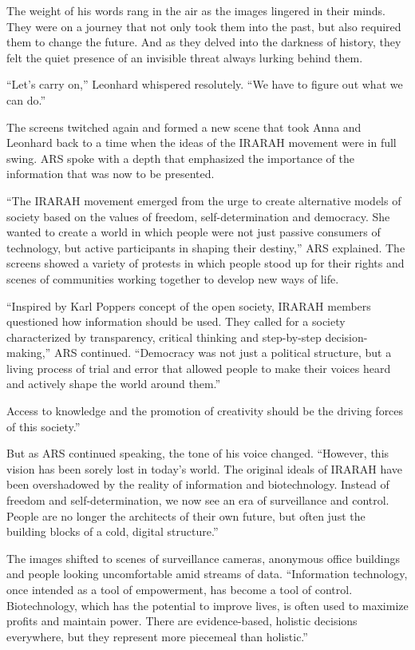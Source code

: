 \documentclass[
]{article}
\begin{document}
The weight of his words rang in the air as the images lingered in their
minds. They were on a journey that not only took them into the past, but
also required them to change the future. And as they delved into the
darkness of history, they felt the quiet presence of an invisible threat
always lurking behind them.

``Let's carry on,'' Leonhard whispered resolutely. ``We have to figure
out what we can do.''

The screens twitched again and formed a new scene that took Anna and
Leonhard back to a time when the ideas of the IRARAH movement were in
full swing. ARS spoke with a depth that emphasized the importance of the
information that was now to be presented.

``The IRARAH movement emerged from the urge to create alternative models
of society based on the values \hspace{0pt}\hspace{0pt}of freedom,
self-determination and democracy. She wanted to create a world in which
people were not just passive consumers of technology, but active
participants in shaping their destiny,'' ARS explained. The screens
showed a variety of protests in which people stood up for their rights
and scenes of communities working together to develop new ways of life.

``Inspired by Karl Popper\textquotesingle s concept of the open society,
IRARAH members questioned how information should be used. They called
for a society characterized by transparency, critical thinking and
step-by-step decision-making,'' ARS continued. ``Democracy was not just
a political structure, but a living process of trial and error that
allowed people to make their voices heard and actively shape the world
around them.''

Access to knowledge and the promotion of creativity should be the
driving forces of this society.''

But as ARS continued speaking, the tone of his voice changed. ``However,
this vision has been sorely lost in today's world. The original ideals
of IRARAH have been overshadowed by the reality of information and
biotechnology. Instead of freedom and self-determination, we now see an
era of surveillance and control. People are no longer the architects of
their own future, but often just the building blocks of a cold, digital
structure.''

The images shifted to scenes of surveillance cameras, anonymous office
buildings and people looking uncomfortable amid streams of data.
``Information technology, once intended as a tool of empowerment, has
become a tool of control. Biotechnology, which has the potential to
improve lives, is often used to maximize profits and maintain power.
There are evidence-based, holistic decisions everywhere, but they
represent more piecemeal than holistic.''
\end{document}
